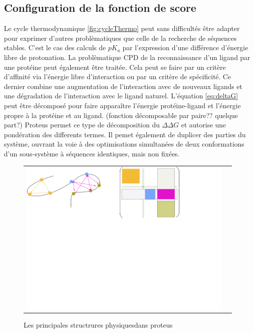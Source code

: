 \begin{enumerate}
 \subsection{Configuration de la fonction de score }

 Le cycle thermodynamique \ref{fig:cycleThermo} peut sans difficultés être adapter pour exprimer d'autres problèmatiques que celle de la recherche de séquences stables. C'est le cas des calculs de $pK_a$ par l'expression d'une différence d'énergie libre de protonation. La problèmatique CPD de la reconnaissance d'un ligand par une protéine peut également être traitée. Cela peut se faire par un critère d'affinité via l'énergie libre d'interaction ou par un critère de spécificité. Ce dernier combine une augmentation de l'interaction avec de nouveaux ligands et une dégradation de l'interaction avec le ligand naturel. L'équation \ref{eq:deltaG} peut être décomposé pour faire apparaître l'énergie protéine-ligand et l'énergie propre à la protéine et au ligand.
(fonction décomposable par paire?? quelque part?)
Proteus permet ce type de décomposition du $\Delta \Delta G$ et autorise une pondération des differents termes. Il pemet également de duplicer des parties du système, ouvrant la voie à des optimisations simultanées de deux conformations d'un sous-système à séquences identiques, mais non fixées.   

   
   \begin{figure}[!htbp]
     \centering
     \begin{tabular}{cc}
       \includegraphics[width=12cm]{figure/proteus/grp_matrix.png} &
     \end{tabular}
     
     \caption{Les principales structrures \og physiques\fg dans proteus}
\label{graph:struct_Phy}
   \end{figure}
   


\end{enumerate}
